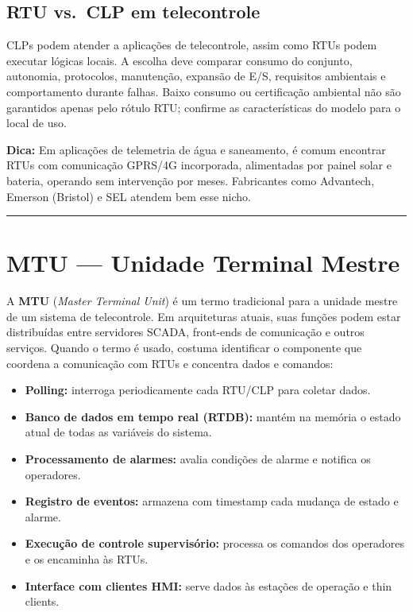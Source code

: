 \subsection{RTU vs.~CLP em telecontrole}\label{rtu-vs.-clp-em-telecontrole}

CLPs podem atender a aplicações de telecontrole, assim como RTUs podem executar lógicas locais. A
escolha deve comparar consumo do conjunto, autonomia, protocolos, manutenção, expansão de E/S,
requisitos ambientais e comportamento durante falhas. Baixo consumo ou certificação ambiental não
são garantidos apenas pelo rótulo RTU; confirme as características do modelo para o local de uso.

\begin{caixadica}

\textbf{Dica:} Em aplicações de telemetria de água e saneamento, é comum encontrar RTUs com comunicação GPRS/4G incorporada, alimentadas por painel solar e bateria, operando sem intervenção por meses. Fabricantes como Advantech, Emerson (Bristol) e SEL atendem bem esse nicho.

\end{caixadica}

\begin{center}\rule{0.5\linewidth}{0.5pt}\end{center}

\section{\texorpdfstring{MTU --- Unidade Terminal Mestre}{MTU  Unidade Terminal Mestre}}\label{mtu-unidade-terminal-mestre}

A \textbf{MTU} (\emph{Master Terminal Unit}) é um termo tradicional para a unidade mestre de um sistema de
telecontrole. Em arquiteturas atuais, suas funções podem estar distribuídas entre servidores
SCADA, front-ends de comunicação e outros serviços. Quando o termo é usado, costuma identificar o
componente que coordena a comunicação com RTUs e concentra dados e comandos:

\begin{itemize}
\tightlist
\item
  \textbf{Polling:} interroga periodicamente cada RTU/CLP para coletar dados.
\item
  \textbf{Banco de dados em tempo real (RTDB):} mantém na memória o estado atual de todas as variáveis do sistema.
\item
  \textbf{Processamento de alarmes:} avalia condições de alarme e notifica os operadores.
\item
  \textbf{Registro de eventos:} armazena com timestamp cada mudança de estado e alarme.
\item
  \textbf{Execução de controle supervisório:} processa os comandos dos operadores e os encaminha às RTUs.
\item
  \textbf{Interface com clientes HMI:} serve dados às estações de operação e thin clients.
\end{itemize}

